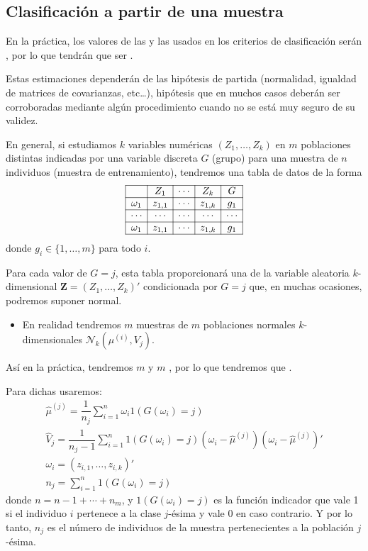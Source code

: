 \subsection{Clasificación a partir de una muestra}

En la práctica, los valores de las  y las  usados en los criterios de clasificación serán , por lo que tendrán que ser .

Estas estimaciones dependerán de las hipótesis de partida (normalidad, igualdad de matrices de covarianzas, etc…), hipótesis que en muchos casos deberán ser corroboradas mediante algún procedimiento cuando no se está muy seguro de su validez.

En general, si estudiamos $k$ variables numéricas $(Z_1,\dots,Z_k)$ en $m$ poblaciones distintas indicadas por una variable discreta $G$ (grupo) para una muestra de $n$ individuos (muestra de entrenamiento), tendremos una tabla de datos de la forma \[ \begin{array}{|c|c|c|c|c|}
\hline
 & Z_1 & \cdots & Z_k & G\\ \hline
 \omega_1 & z_{1,1} & \cdots & z_{1,k} & g_1 \\ \hline
 \cdots & \cdots & \cdots & \cdots & \cdots \\ \hline
 \omega_1 & z_{1,1} & \cdots & z_{1,k} & g_1 \\ \hline
\end{array} \]donde $g_i\in\{1,\dots, m\}$ para todo $i$.

Para cada valor de $G=j$, esta tabla proporcionará una \mas de la variable aleatoria $k$-dimensional $\mathbf{Z}=(Z_1,\dots,Z_k)'$ condicionada por $G=j$ que, en muchas ocasiones, podremos suponer normal.
\begin{itemize}
\item En realidad tendremos $m$ muestras de $m$ poblaciones normales $k$-dimensionales $\mathcal{N}_k(\mu^{(i)},V_j)$.
\end{itemize}
Así en la práctica, tendremos $m$  y $m$ , por lo que tendremos que .

Para dichas  usaremos: \[ \begin{array}{l}
\hat{\mu}^{(j)}=\dfrac{1}{n_j}\sum_{i=1}^{n}\omega_i1(G(\omega_i)=j)\\
\hat{V}_j=\dfrac{1}{n_j-1}\sum_{i=1}^{n}1(G(\omega_i)=j)(\omega_i-\hat{\mu}^{(j)})(\omega_i-\hat{\mu}^{(j)})'\\
\omega_i=(z_{i,1},\dots,z_{i,k})'\\
n_j=\sum_{i=1}^{n}1(G(\omega_i)=j)
\end{array} \]donde $n=n-1+\cdots+n_m$, y $1(G(\omega_i)=j)$ es la función indicador que vale 1 si el individuo $i$ pertenece a la clase $j$-ésima y vale 0 en caso contrario. Y por lo tanto, $n_j$ es el número de individuos de la muestra pertenecientes a la población $j$-ésima.

